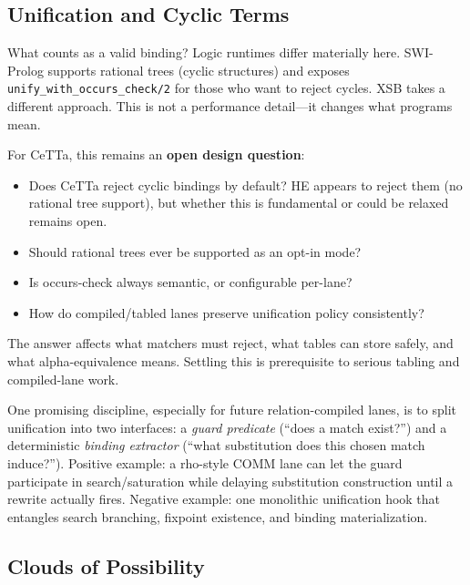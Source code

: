 \documentclass[11pt]{article}
\newcommand{\code}[1]{\texttt{#1}}
\newcommand{\HE}{\textup{HE}}
\newcommand{\CeTTa}{\textup{CeTTa}}
\newcommand{\XSB}{\textup{XSB}}
\begin{document}
\subsection{Unification and Cyclic Terms}

What counts as a valid binding?  Logic runtimes differ materially here.
SWI-Prolog supports rational trees (cyclic structures) and exposes
\code{unify\_with\_occurs\_check/2} for those who want to reject cycles.
\XSB{} takes a different approach.  This is not a performance detail---it
changes what programs mean.

For \CeTTa{}, this remains an \textbf{open design question}:
\begin{itemize}
\item Does \CeTTa{} reject cyclic bindings by default?  \HE{} appears to
  reject them (no rational tree support), but whether this is fundamental
  or could be relaxed remains open.
\item Should rational trees ever be supported as an opt-in mode?
\item Is occurs-check always semantic, or configurable per-lane?
\item How do compiled/tabled lanes preserve unification policy consistently?
\end{itemize}

The answer affects what matchers must reject, what tables can store safely,
and what alpha-equivalence means.  Settling this is prerequisite to
serious tabling and compiled-lane work.

One promising discipline, especially for future relation-compiled lanes,
is to split unification into two interfaces: a \emph{guard predicate}
(``does a match exist?'') and a deterministic \emph{binding extractor}
(``what substitution does this chosen match induce?'').  Positive
example: a rho-style COMM lane can let the guard participate in
search/saturation while delaying substitution construction until a
rewrite actually fires.  Negative example: one monolithic unification
hook that entangles search branching, fixpoint existence, and binding
materialization.

\subsection{Clouds of Possibility}
\end{document}
